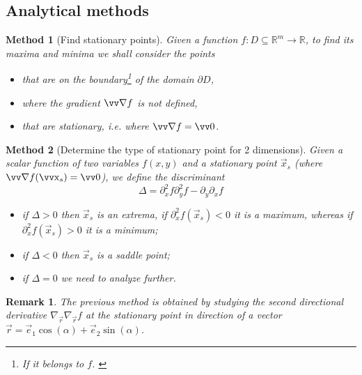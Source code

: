 \documentclass[twocolumn, margin=normal]{tex/hsrzf}
\theoremstyle{fuvarzf}
\newtheorem{method}{Method}
\newtheorem{remark}{Remark}
\begin{document}
\subsection{Analytical methods}

\begin{method}[Find stationary points]
  Given a function \(f: D \subseteq \mathbb{R}^m \to \mathbb{R}\), to
  find its maxima and minima we shall consider the points
  \begin{itemize}
    \item that are on the boundary\footnote{If it belongs to \(f\).
      \label{ftn:boundary}} of the domain \(\partial D\),
    \item where the gradient \(\grad f\) is not defined,
    \item that are stationary, i.e. where \(\grad f = \vec{0}\).
  \end{itemize}
\end{method}

\begin{method}[Determine the type of stationary point for 2 dimensions]
  Given a scalar function of two variables \(f(x,y)\) and a stationary point
  \(\vec{x}_s\) (where \(\grad f(\vec{x}_s) = \vec{0}\)), we define the
  \emph{discriminant}
  \[
    \Delta = \partial_x^2 f \partial_y^2 f - \partial_y \partial_x f
  \]
  \begin{itemize}
    \item if \(\Delta > 0\) then \(\vec{x}_s\) is an extrema, if \(\partial_x^2
      f(\vec{x}_s) < 0\) it is a maximum, whereas if \(\partial_x^2
      f(\vec{x}_s) > 0\) it is a minimum;

    \item if \(\Delta < 0\) then \(\vec{x}_s\) is a saddle point;

    \item if \(\Delta = 0\) we need to analyze further.
  \end{itemize}
\end{method}

\begin{remark}
  The previous method is obtained by studying the second directional derivative
  \(\nabla_\vec{r}\nabla_\vec{r} f\) at the stationary point in direction of a
  vector \(\vec{r} = \vec{e}_1\cos(\alpha) + \vec{e}_2\sin(\alpha)\).
\end{remark}
\end{document}
